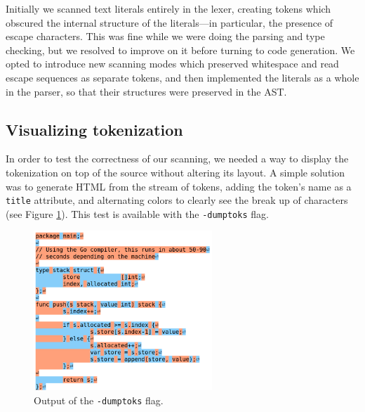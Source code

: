 \documentclass[oneside]{article}
\begin{document}
Initially we scanned text literals entirely in the lexer, creating tokens which obscured the internal structure of the literals---in particular, the presence of escape characters. This was fine while we were doing the parsing and type checking, but we resolved to improve on it before turning to code generation. We opted to introduce new scanning modes which preserved whitespace and read escape sequences as separate tokens, and then implemented the literals as a whole in the parser, so that their structures were preserved in the AST.

\subsection{Visualizing tokenization}
In order to test the correctness of our scanning, we needed a way to display the tokenization on top of the source without altering its layout. A simple solution was to generate HTML from the stream of tokens, adding the token's name as a \verb|title| attribute, and alternating colors to clearly see the break up of characters (see Figure \ref{fig:screen_dumptoks}). This test is available with the \verb|-dumptoks| flag.

\begin{figure}[H]
	\centering
    \includegraphics[width=0.6\textwidth]{screen_dumptoks}
    \caption{Output of the \texttt{-dumptoks} flag.}
    \label{fig:screen_dumptoks}
\end{figure}
\end{document}
